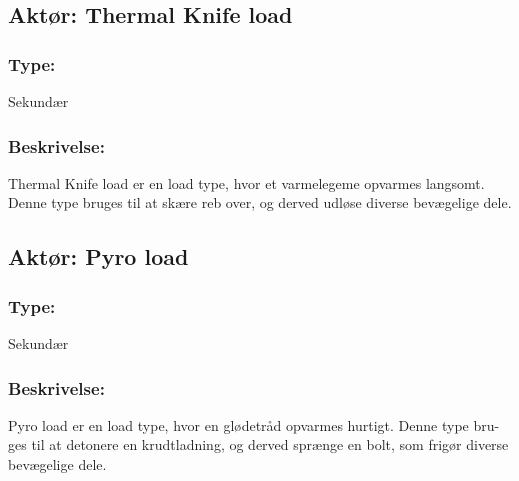 \begin{framed}
	\subsection{Aktør: Thermal Knife load}
	\subsubsection*{Type:}
	Sekundær
	
	\subsubsection*{Beskrivelse:}
	Thermal Knife load er en load type, hvor et varmelegeme opvarmes langsomt. \indent Denne type bruges til at skære reb over, og derved udløse diverse bevægelige \indent dele.
\end{framed}

\begin{framed}
	\subsection{Aktør: Pyro load}
	\subsubsection*{Type:}
	Sekundær
	
	\subsubsection*{Beskrivelse:}
	Pyro load er en load type, hvor en glødetråd opvarmes hurtigt. Denne type bru- \indent ges til at detonere en krudtladning, og derved sprænge en bolt, som frigør diverse \indent bevægelige dele.
\end{framed}

\clearpage

	

